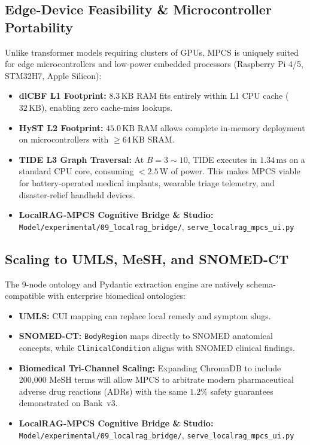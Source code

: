 \documentclass[10pt,twocolumn,letterpaper]{article}
\begin{document}
\subsection{Edge-Device Feasibility \& Microcontroller Portability}
Unlike transformer models requiring clusters of GPUs, MPCS is uniquely suited for edge microcontrollers and low-power embedded processors (Raspberry Pi 4/5, STM32H7, Apple Silicon):
\begin{itemize}
  \item \textbf{dlCBF L1 Footprint:} $8.3\,\text{KB}$ RAM fits entirely within L1 CPU cache ($32\,\text{KB}$), enabling zero cache-miss lookups.
  \item \textbf{HyST L2 Footprint:} $45.0\,\text{KB}$ RAM allows complete in-memory deployment on microcontrollers with $\ge 64\,\text{KB}$ SRAM.
  \item \textbf{TIDE L3 Graph Traversal:} At $B=3 \sim 10$, TIDE executes in $1.34\,\text{ms}$ on a standard CPU core, consuming $<2.5\,\text{W}$ of power. This makes MPCS viable for battery-operated medical implants, wearable triage telemetry, and disaster-relief handheld devices.
  \item \textbf{LocalRAG-MPCS Cognitive Bridge \& Studio:} \nolinkurl{Model/experimental/09_localrag_bridge/}, \nolinkurl{serve_localrag_mpcs_ui.py}
\end{itemize}

\subsection{Scaling to UMLS, MeSH, and SNOMED-CT}
The 9-node ontology and Pydantic extraction engine are natively schema-compatible with enterprise biomedical ontologies:
\begin{itemize}
  \item \textbf{UMLS:} CUI mapping can replace local remedy and symptom slugs.
  \item \textbf{SNOMED-CT:} \texttt{BodyRegion} maps directly to SNOMED anatomical concepts, while \texttt{ClinicalCondition} aligns with SNOMED clinical findings.
  \item \textbf{Biomedical Tri-Channel Scaling:} Expanding ChromaDB to include 200,000 MeSH terms will allow MPCS to arbitrate modern pharmaceutical adverse drug reactions (ADRs) with the same $1.2\%$ safety guarantees demonstrated on Bank~v3.
  \item \textbf{LocalRAG-MPCS Cognitive Bridge \& Studio:} \nolinkurl{Model/experimental/09_localrag_bridge/}, \nolinkurl{serve_localrag_mpcs_ui.py}
\end{itemize}
\end{document}
